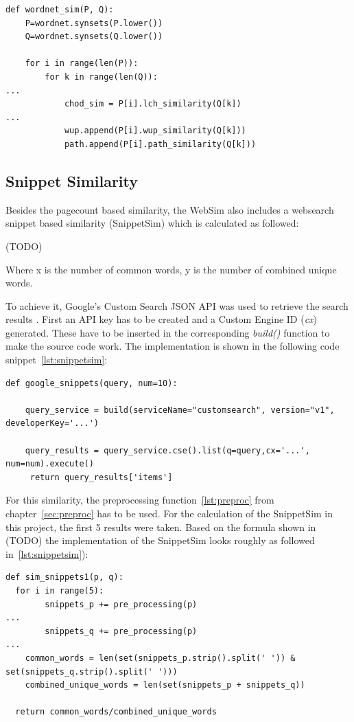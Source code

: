 \documentclass[conference]{IEEEtran}
\begin{document}
\begin{lstlisting}[frame=single, label=lst:wup, caption={Use of WUP, PATH and LCH}, captionpos=b]
def wordnet_sim(P, Q):
    P=wordnet.synsets(P.lower())
    Q=wordnet.synsets(Q.lower())

    for i in range(len(P)):
        for k in range(len(Q)):
...
            chod_sim = P[i].lch_similarity(Q[k])
...
            wup.append(P[i].wup_similarity(Q[k]))
            path.append(P[i].path_similarity(Q[k]))
\end{lstlisting}

\subsection{Snippet Similarity}\label{subsec:wup}

Besides the pagecount based similarity, the WebSim also includes a websearch snippet based similarity (SnippetSim) which is calculated as followed:

(TODO)

Where x is the number of common words, y is the number of combined unique words.

To achieve it, Google's Custom Search JSON API was used to retrieve the search results \cite{customsearch}. First an API key has to be created \cite{customsearch} and a Custom Engine ID (\textit{cx}) generated. These have to be inserted in the corresponding \textit{build()} function to make the source code work. The implementation is shown in the following code snippet~\ref{lst:snippetsim}:

\begin{lstlisting}[frame=single, label=lst:snippetsim, caption={Connection to Google Search API}, captionpos=b]
def google_snippets(query, num=10):

    query_service = build(serviceName="customsearch", version="v1", developerKey='...')

    query_results = query_service.cse().list(q=query,cx='...', num=num).execute()
     return query_results['items']
\end{lstlisting}

For this similarity, the preprocessing function~\ref{lst:preproc} from chapter~\ref{sec:preproc} has to be used. For the calculation of the SnippetSim in this project, the first 5 results were taken. Based on the formula shown in (TODO) the implementation of the SnippetSim looks roughly as followed in~\ref{lst:snippetsim}):

\begin{lstlisting}[frame=single, label=lst:snippetsim, caption={Calculation of SnippetSim}, captionpos=b]
def sim_snippets1(p, q):
  for i in range(5):
        snippets_p += pre_processing(p)    
... 
        snippets_q += pre_processing(p)
...    
    common_words = len(set(snippets_p.strip().split(' ')) & set(snippets_q.strip().split(' '))) 
    combined_unique_words = len(set(snippets_p + snippets_q))
    
  return common_words/combined_unique_words
\end{lstlisting}
\end{document}
